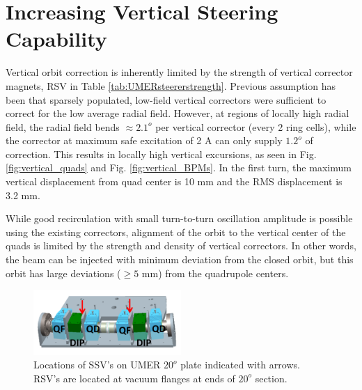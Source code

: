 \section{Increasing Vertical Steering Capability} \label{sec:steering:SSV}

Vertical orbit correction is inherently limited by the strength of vertical corrector magnets, RSV in Table \ref{tab:UMERsteererstrength}.
Previous assumption has been that sparsely populated, low-field vertical correctors were sufficient to correct for the low average radial field. However, at regions of locally high radial field, the radial field bends $\approx 2.1^o$ per vertical corrector (every 2 ring cells), while the corrector at maximum safe excitation of 2 A can only supply $1.2^o$ of correction. This results in locally high vertical excursions, as seen in Fig. \ref{fig:vertical_quads} and Fig. \ref{fig:vertical_BPMs}. In the first turn, the maximum vertical displacement from quad center is 10 mm and the RMS displacement is 3.2 mm. 


While good recirculation with small turn-to-turn oscillation amplitude is possible using the existing correctors, alignment of the orbit to the vertical center of the quads is limited by the strength and density of vertical correctors. In other words, the beam can be injected with minimum deviation from the closed orbit, but this orbit has large deviations ($\ge 5$ mm) from the quadrupole centers.  


\begin{figure}[]
\centering
\includegraphics[width=0.5\textwidth]{6.figures/SSV/SSVlocations.png}
\caption{Locations of SSV's on UMER $20^o$ plate indicated with arrows. RSV's are located at vacuum flanges at ends of $20^o$ section.}
\label{fig:SSVlocation}
\end{figure}

